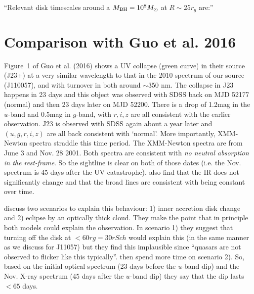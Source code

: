\documentclass[11pt,a4paper]{article}
\begin{document}
``Relevant disk timescales around a $M_{\rm BH} = 10^{8} M_{\odot}$ at $R\sim 25r_{g}$ are:''

\section{Comparison with Guo et al. 2016}
Figure~1 of Guo et al. (2016) shows a UV collapse (green curve) in
their source (J23+) at a very similar wavelength to that in the 2010
spectrum of our source (J110057), and with turnover in both around
$\sim$350 nm.  The collapse in J23 happens in 23 days \citep[Figure 2
of ][]{Guo2016} and this object was observed with SDSS back on MJD
52177 (normal) and then 23 days later on MJD 52200. There is a drop of
1.2mag in the $u$-band and 0.5mag in $g$-band, with $r,i,z$ are all
consistent with the earlier observation. J23 is observed with SDSS
again about a year later and $(u,g,r,i,z)$ are all back consistent
with `normal'. More importantly, XMM-Newton spectra straddle this time
period. The XMM-Newton spectra are from June 3 and Nov. 28 2001. Both
spectra are consistent with {\it no neutral absorption in the
rest-frame}. So the sightline is clear on both of those dates
(i.e. the Nov. spectrum is 45 days after the UV
catastrophe). \citet{Guo2016} also find that the IR does not
significantly change and that the broad lines are consistent with
being constant over time.


\citet{Guo2016} discuss two scenarios to explain this behaviour: 1)
inner accretion disk change and 2) eclipse by an optically thick
cloud. They make the point that in principle both models could
explain the observation. In scenario 1) they suggest that turning off
the disk at $< 60rg = 30 rSch$ would explain this (in the same manner
as we discuss for J11057) but they find this implausible since
``quasars are not observed to flicker like this typically''.
\citet{Guo2016} then spend more time on scenario 2). So, based on the
initial optical spectrum (23 days before the $u$-band dip) and the
Nov. X-ray spectrum (45 days after the $u$-band dip) they say that the
dip lasts $< 65$ days. 





\end{document}
